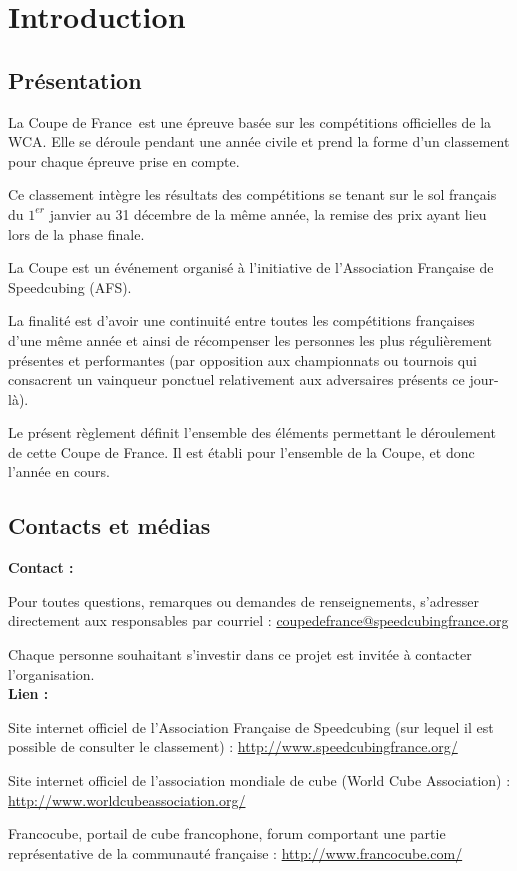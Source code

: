 \documentclass[10pt,a4paper]{article}
\newcommand{\cdf}{Coupe de France}
\newcommand{\3}{$3\times3$}
\newcommand{\4}{$4\times4$}
\newcommand{\2}{$2\times2$}
\begin{document}
\pagebreak


\pagebreak

\section{Introduction}
\subsection{Présentation}

La \cdf\ est une épreuve basée sur les compétitions officielles de la WCA. Elle se déroule pendant une année civile et prend la forme d'un classement pour chaque épreuve prise en compte.

Ce classement intègre les résultats des compétitions se tenant sur le sol français du $1^{er}$ janvier au 31 décembre de la même année, la remise des prix ayant lieu lors de la phase finale.

La Coupe est un événement organisé à l'initiative de l'Association Française de Speedcubing (AFS).

La finalité est d'avoir une continuité entre toutes les compétitions françaises d'une même année et ainsi de récompenser les personnes les plus régulièrement présentes et performantes (par opposition aux championnats ou tournois qui consacrent un vainqueur ponctuel relativement aux adversaires présents ce jour-là).

Le présent règlement définit l'ensemble des éléments permettant le déroulement de cette Coupe de France. Il est établi pour l'ensemble de la Coupe, et donc l'année en cours.

\subsection{Contacts et médias}
\begin{em}

\textbf{Contact :}

Pour toutes questions, remarques ou demandes de renseignements, s'adresser directement aux responsables par courriel : \href{mailto:coupedefrance@speedcubingfrance.org}{coupedefrance@speedcubingfrance.org}

Chaque personne souhaitant s'investir dans ce projet est invitée à contacter l'organisation.
\\

\textbf{Lien :}

Site internet officiel de l'Association Française de Speedcubing (sur lequel il est possible de consulter le classement) : \url{http://www.speedcubingfrance.org/}

Site internet officiel de l'association mondiale de cube (World Cube Association) : \url{http://www.worldcubeassociation.org/}

Francocube, portail de cube francophone, forum comportant une partie représentative de la communauté française : \url{http://www.francocube.com/}


\end{em}
\end{document}
